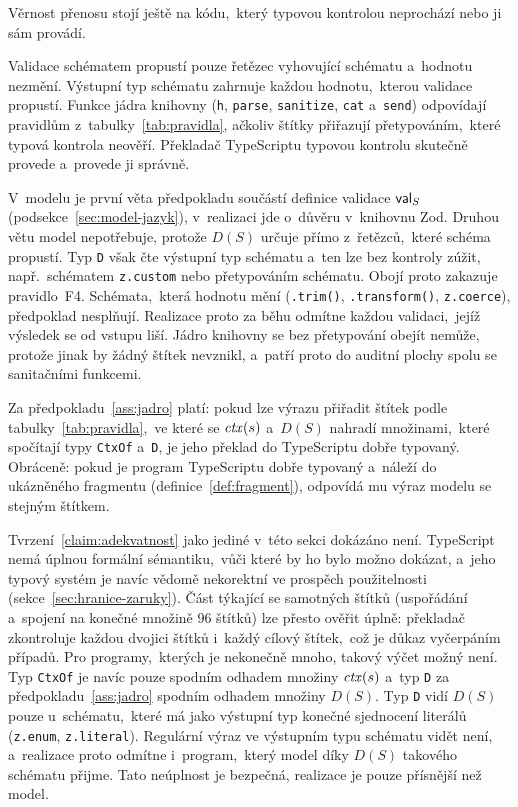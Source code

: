 Věrnost přenosu stojí ještě na kódu,~který typovou kontrolou neprochází nebo ji sám provádí.

\begin{predpoklad}
\label{ass:jadro}
Validace schématem propustí pouze řetězec vyhovující schématu a~hodnotu nezmění. Výstupní typ schématu zahrnuje každou hodnotu,~kterou validace propustí. Funkce jádra knihovny (\texttt{h}, \texttt{parse}, \texttt{sanitize}, \texttt{cat} a~\texttt{send}) odpovídají pravidlům z~tabulky~\ref{tab:pravidla}, ačkoliv štítky přiřazují přetypováním,~které typová kontrola neověří. Překladač TypeScriptu typovou kontrolu skutečně provede a~provede ji správně.
\end{predpoklad}

V~modelu je první věta předpokladu součástí definice validace $\mathsf{val}_S$ (podsekce~\ref{sec:model-jazyk}), v~realizaci jde o~důvěru v~knihovnu Zod. Druhou větu model nepotřebuje, protože $D(S)$ určuje přímo z~řetězců,~které schéma propustí. Typ \texttt{D} však čte výstupní typ schématu a~ten lze bez kontroly zúžit, např.~schématem \texttt{z.custom} nebo přetypováním schématu. Obojí proto zakazuje pravidlo~F4. Schémata,~která hodnotu mění (\texttt{.trim()}, \texttt{.transform()}, \texttt{z.coerce}), předpoklad nesplňují. Realizace proto za běhu odmítne každou validaci,~jejíž výsledek se od vstupu liší. Jádro knihovny se bez přetypování obejít nemůže, protože jinak by žádný štítek nevznikl, a~patří proto do auditní plochy spolu se sanitačními funkcemi.

\begin{tvrzeni}
\label{claim:adekvatnost}
Za předpokladu~\ref{ass:jadro} platí: pokud lze výrazu přiřadit štítek podle tabulky~\ref{tab:pravidla},~ve které se $\mathit{ctx}(s)$ a~$D(S)$ nahradí množinami,~které spočítají typy \texttt{CtxOf} a~\texttt{D}, je jeho překlad do TypeScriptu dobře typovaný. Obráceně: pokud je program TypeScriptu dobře typovaný a~náleží do ukázněného fragmentu (definice~\ref{def:fragment}), odpovídá mu výraz modelu se stejným štítkem.
\end{tvrzeni}

Tvrzení~\ref{claim:adekvatnost} jako jediné v~této sekci dokázáno není. TypeScript nemá úplnou formální sémantiku,~vůči které by ho bylo možno dokázat, a~jeho typový systém je navíc vědomě nekorektní ve prospěch použitelnosti (sekce~\ref{sec:hranice-zaruky}). Část týkající se samotných štítků (uspořádání a~spojení na konečné množině 96 štítků) lze přesto ověřit úplně: překladač zkontroluje každou dvojici štítků i~každý cílový štítek,~což je důkaz vyčerpáním případů. Pro programy,~kterých je nekonečně mnoho, takový výčet možný není. Typ \texttt{CtxOf} je navíc pouze spodním odhadem množiny $\mathit{ctx}(s)$ a~typ \texttt{D} za předpokladu~\ref{ass:jadro} spodním odhadem množiny $D(S)$. Typ \texttt{D} vidí $D(S)$ pouze u~schématu,~které má jako výstupní typ konečné sjednocení literálů (\texttt{z.enum}, \texttt{z.literal}). Regulární výraz ve výstupním typu schématu vidět není, a~realizace proto odmítne i~program,~který model díky $D(S)$ takového schématu přijme. Tato neúplnost je bezpečná, realizace je pouze přísnější než model.

